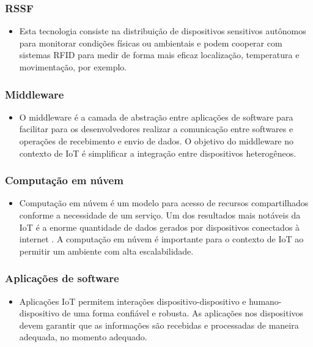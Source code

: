 	\subsubsection{\acrfull{RSSF}}
		\begin{itemize}
			\item Esta tecnologia consiste na distribuição de dispositivos sensitivos autônomos para monitorar condições físicas ou
			ambientais e podem cooperar com sistemas \acrshort{RFID} para medir de forma mais eficaz localização, temperatura e movimentação, por exemplo.
			\cite{IOTS}
		\end{itemize}
	\subsubsection{Middleware}
		\begin{itemize}
			\item O middleware é a camada de abstração entre aplicações de software para facilitar para os desenvolvedores
			 realizar a comunicação entre softwares e operações de recebimento e envio de dados. O objetivo do middleware no contexto
			  de \acrshort{IoT} é simplificar a integração entre dispositivos heterogêneos.
		\end{itemize}
	\subsubsection{Computação em núvem}
		\begin{itemize}
			\item Computação em núvem é um modelo para acesso de recursos compartilhados conforme a necessidade de um serviço. Um dos resultados mais notáveis
			da \acrshort{IoT} é a enorme quantidade de dados gerados por dispositivos conectados à internet \cite{IOTV}. A computação em núvem é importante para o contexto de \acrlong{IoT}
			ao permitir um ambiente com alta escalabilidade.
		\end{itemize}
	\subsubsection{Aplicações de software}
		\begin{itemize}
			\item Aplicações \acrshort{IoT} permitem interações dispositivo-dispositivo e humano-dispositivo de uma forma confiável e robusta.
			As aplicações nos dispositivos devem garantir que as informações são recebidas e processadas de maneira adequada, no momento
			adequado.

		\end{itemize}

